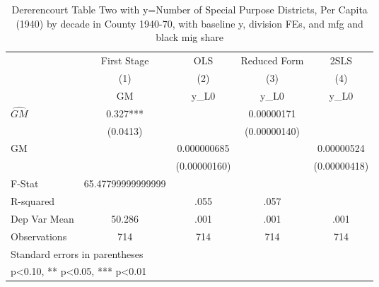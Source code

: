 \begin{table}[htbp]\centering
\def\sym#1{\ifmmode^{#1}\else\(^{#1}\)\fi}
\caption{Dererencourt Table Two with y=Number of Special Purpose Districts, Per Capita (1940) by decade in County 1940-70, with baseline y, division FEs, and mfg and black mig share}
\begin{tabular}{l*{4}{c}}
\toprule
                    & First Stage   &         OLS   &Reduced Form   &        2SLS   \\
                    &\multicolumn{1}{c}{(1)}&\multicolumn{1}{c}{(2)}&\multicolumn{1}{c}{(3)}&\multicolumn{1}{c}{(4)}\\
                    &\multicolumn{1}{c}{GM}&\multicolumn{1}{c}{y\_L0}&\multicolumn{1}{c}{y\_L0}&\multicolumn{1}{c}{y\_L0}\\
\midrule
$\hat{GM}$          &       0.327***&               &  0.00000171   &               \\
                    &    (0.0413)   &               &(0.00000140)   &               \\
\addlinespace
GM                  &               & 0.000000685   &               &  0.00000524   \\
                    &               &(0.00000160)   &               &(0.00000418)   \\
\midrule
F-Stat              &65.47799999999999   &               &               &               \\
R-squared           &               &        .055   &        .057   &               \\
Dep Var Mean        &      50.286   &        .001   &        .001   &        .001   \\
Observations        &         714   &         714   &         714   &         714   \\
\bottomrule
\multicolumn{5}{l}{\footnotesize Standard errors in parentheses}\\
\multicolumn{5}{l}{\footnotesize * p<0.10, ** p<0.05, *** p<0.01}\\
\end{tabular}
\end{table}
